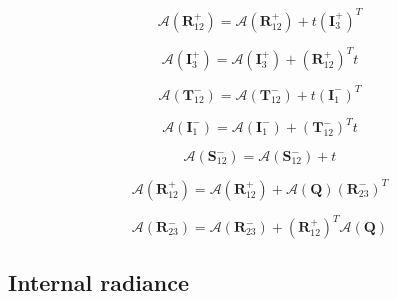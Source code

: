 \begin{equation}
\mathcal{A}(\mathbf{R}^{+}_{12}) = \mathcal{A}(\mathbf{R}^{+}_{12}) + t (\mathbf{I}^{+}_{3})^{T}
\label{eq:radiance-boa_radiance-adjoint_of_tangent_linear-l_l_R_p_12_a}
\end{equation}

\begin{equation}
\mathcal{A}(\mathbf{I}^{+}_{3}) = \mathcal{A}(\mathbf{I}^{+}_{3}) + (\mathbf{R}^{+}_{12})^{T} t
\label{eq:radiance-boa_radiance-adjoint_of_tangent_linear-l_l_I_p_3_a}
\end{equation}

\begin{equation}
\mathcal{A}(\mathbf{T}^{-}_{12}) = \mathcal{A}(\mathbf{T}^{-}_{12}) + t (\mathbf{I}^{-}_{1})^{T}
\label{eq:radiance-boa_radiance-adjoint_of_tangent_linear-l_l_T_m_12_a}
\end{equation}

\begin{equation}
\mathcal{A}(\mathbf{I}^{-}_{1}) = \mathcal{A}(\mathbf{I}^{-}_{1}) + (\mathbf{T}^{-}_{12})^{T} t
\label{eq:radiance-boa_radiance-adjoint_of_tangent_linear-l_l_I_m_1_a}
\end{equation}

\begin{equation}
\mathcal{A}(\mathbf{S}^{-}_{12}) = \mathcal{A}(\mathbf{S}^{-}_{12}) + t
\label{eq:radiance-boa_radiance-adjoint_of_tangent_linear-l_l_S_m_12_a}
\end{equation}

\begin{equation}
\mathcal{A}(\mathbf{R}^{+}_{12}) = \mathcal{A}(\mathbf{R}^{+}_{12}) + \mathcal{A}(\mathbf{Q}) (\mathbf{R}^{-}_{23})^{T}
\label{eq:radiance-boa_radiance-adjoint_of_tangent_linear-l_l_R_p_12_a}
\end{equation}

\begin{equation}
\mathcal{A}(\mathbf{R}^{-}_{23}) = \mathcal{A}(\mathbf{R}^{-}_{23}) + (\mathbf{R}^{+}_{12})^{T} \mathcal{A}(\mathbf{Q})
\label{eq:radiance-boa_radiance-adjoint_of_tangent_linear-l_l_R_m_23_a}
\end{equation}


%
\subsection{Internal radiance}
\label{sec:radiance-internal_radiance}


